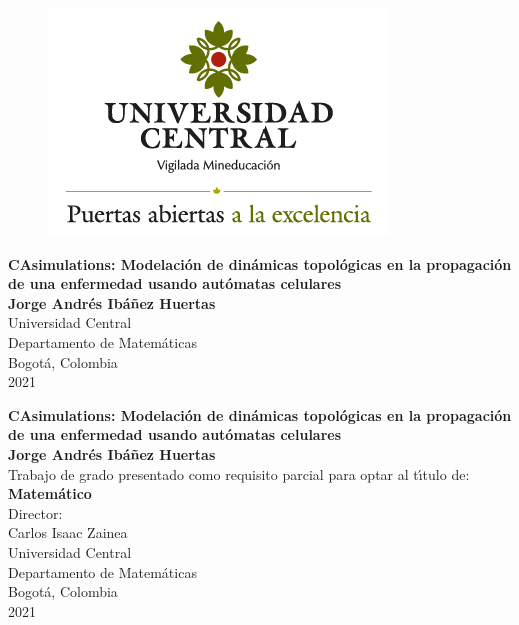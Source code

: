 \begin{center}
\begin{figure}
\centering%
\includegraphics[scale=0.4]{Imagenes/logo_1.png}
\end{figure}
\thispagestyle{empty} \vspace*{2.0cm} \textbf{\huge
CAsimulations: Modelación de dinámicas topológicas en la propagación de una enfermedad usando autómatas celulares}\\[6.0cm]
\Large\textbf{Jorge Andrés Ibáñez Huertas}\\[4.0cm]
\small Universidad Central\\
Departamento de Matemáticas\\
Bogotá, Colombia\\
2021\\
\end{center}

\newpage{\pagestyle{empty}\cleardoublepage}

\newpage
\begin{center}
\thispagestyle{empty} \vspace*{0cm} \textbf{\huge
CAsimulations: Modelación de dinámicas topológicas en la propagación de una enfermedad usando autómatas celulares}\\[3.5cm]
\Large\textbf{Jorge Andrés Ibáñez Huertas}\\[3.0cm]
\small Trabajo de grado presentado como requisito parcial para optar al
t\'{\i}tulo de:\\
\textbf{Matemático}\\[3.0cm]
Director:\\
Carlos Isaac Zainea\\[3.5cm]
Universidad Central\\
Departamento de Matemáticas\\
Bogotá, Colombia\\
2021\\
\end{center}

